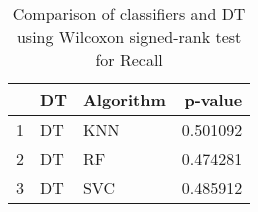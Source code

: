 \begin{table}
\footnotesize
\caption{Comparison of classifiers and DT using Wilcoxon signed-rank test for Recall}
\label{tab:DT wilcoxon Recall comparison}
\begin{tabular}{lllr}
\hline
 & DT & Algorithm & p-value \\
\hline
1 & DT & KNN & 0.501092 \\
2 & DT & RF & 0.474281 \\
3 & DT & SVC & 0.485912 \\
\hline
\end{tabular}
\end{table}
